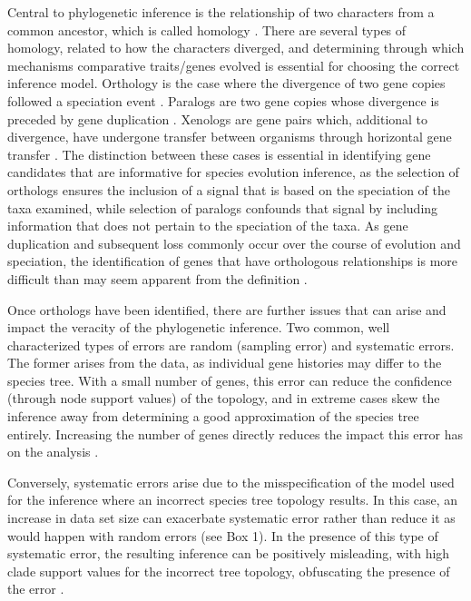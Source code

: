 \documentclass[fleqn,10pt,lineno]{wlpeerj} %
\begin{document}
Central to phylogenetic inference is the relationship of two characters from a common ancestor, which is called homology \cite{fitch2000homology}. 
There are several types of homology, related to how the characters diverged, and determining through which mechanisms comparative traits/genes evolved is essential for choosing the correct inference model. 
Orthology is the case where the divergence of two gene copies followed a speciation event \cite{fitch1970distinguishing}. 
Paralogs are two gene copies whose divergence is preceded by gene duplication \cite{fitch1970distinguishing}.
Xenologs are gene pairs which, additional to divergence, have undergone transfer between organisms through horizontal gene transfer \cite{darby2016xenolog}.
The distinction between these cases is essential in identifying gene candidates that are informative for species evolution inference, as the selection of orthologs ensures the inclusion of a signal that is based on the speciation of the taxa examined, while selection of paralogs confounds that signal by including information that does not pertain to the speciation of the taxa. 
As gene duplication and subsequent loss commonly occur over the course of evolution and speciation, the identification of genes that have orthologous relationships is more difficult than may seem apparent from the definition \cite{gabaldon2008large}. 

Once orthologs have been identified, there are further issues that can arise and impact the veracity of the phylogenetic inference.
Two common, well characterized types of errors are random (sampling error) and systematic errors. 
The former arises from the data, as individual gene histories may differ to the species tree. 
With a small number of genes, this error can reduce the confidence (through node support values) of the topology, and in extreme cases skew the inference away from determining a good approximation of the species tree entirely. 
Increasing the number of genes directly reduces the impact this error has on the analysis \cite{philippe2004phylogenomics,heath2008taxon}. 

Conversely, systematic errors arise due to the misspecification of the model used for the inference where an incorrect species tree topology results. 
In this case, an increase in data set size can exacerbate systematic error rather than reduce it as would happen with random errors (see Box 1). 
In the presence of this type of systematic error, the resulting inference can be positively misleading,
 with high clade support values for the incorrect tree topology, obfuscating the presence of the error \cite{jeffroy2006phylogenomics,roch2015likelihood,kubatko2007inconsistency}. 
\end{document}
